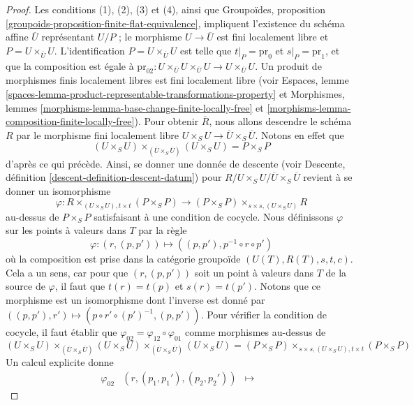 \begin{proof}
Les conditions (1), (2), (3) et (4), ainsi que
Groupoïdes, proposition \ref{groupoids-proposition-finite-flat-equivalence},
impliquent l'existence du schéma affine $\overline{U}$ représentant $U/P$ ;
le morphisme $U \to \overline{U}$ est fini localement libre et
$P = U \times_{\overline{U}} U$. L'identification
$P = U \times_{\overline{U}} U$ est telle que $t|_P = \text{pr}_0$ et
$s|_P = \text{pr}_1$, et que la composition est égale à
$\text{pr}_{02} : U \times_{\overline{U}} U \times_{\overline{U}} U
\to U \times_{\overline{U}} U$.
Un produit de morphismes finis localement libres est fini localement libre (voir
Espaces, lemme \ref{spaces-lemma-product-representable-transformations-property}
et
Morphismes, lemmes \ref{morphisms-lemma-base-change-finite-locally-free} et
\ref{morphisms-lemma-composition-finite-locally-free}).
Pour obtenir $\overline{R}$, nous allons descendre
le schéma $R$ par le morphisme fini localement libre
$U \times_S U \to \overline{U} \times_S \overline{U}$.
Notons en effet que
$$
(U \times_S U)
\times_{(\overline{U} \times_S \overline{U})}
(U \times_S U)
=
P \times_S P
$$
d'après ce qui précède. Ainsi, se donner une donnée de descente (voir
Descente, définition \ref{descent-definition-descent-datum})
pour $R / U \times_S U / \overline{U} \times_S \overline{U}$
revient à se donner un isomorphisme
$$
\varphi :
R \times_{(U \times_S U), t \times t} (P \times_S P)
\longrightarrow
(P \times_S P) \times_{s \times s, (U \times_S U)} R
$$
au-dessus de $P \times_S P$ satisfaisant à une condition de cocycle. Nous définissons $\varphi$
sur les points à valeurs dans $T$ par la règle
$$
\varphi : (r, (p, p')) \longmapsto ((p, p'), p^{-1} \circ r \circ p')
$$
où la composition est prise dans la catégorie groupoïde
$(U(T), R(T), s, t, c)$.
Cela a un sens, car pour que $(r, (p, p'))$ soit un point à valeurs dans $T$
de la source de $\varphi$, il faut que $t(r) = t(p)$
et $s(r) = t(p')$. Notons que ce morphisme est un isomorphisme
dont l'inverse est donné par
$((p, p'), r') \mapsto (p \circ r' \circ (p')^{-1}, (p, p'))$.
Pour vérifier la condition de cocycle, il faut établir que
$\varphi_{02} = \varphi_{12} \circ \varphi_{01}$
comme morphismes au-dessus de
$$
(U \times_S U)
\times_{(\overline{U} \times_S \overline{U})} (U \times_S U)
\times_{(\overline{U} \times_S \overline{U})} (U \times_S U) =
(P \times_S P) \times_{s \times s, (U \times_S U), t \times t} (P \times_S P)
$$
Un calcul explicite donne
$$
\begin{matrix}
\varphi_{02} & (r, (p_1, p_1'), (p_2, p_2')) & \mapsto &

\end{matrix}$$
\end{proof}

